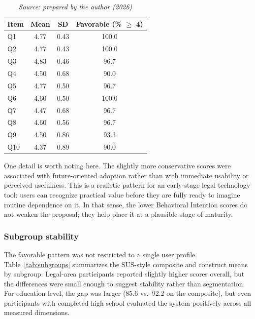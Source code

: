 \documentclass[english]{UNISINOSartigo} %
\newcommand{\floatsource}[1]{\caption*{\footnotesize\textit{Source: #1}}}
\newcommand{\tablesource}[1]{\floatsource{#1}}
\begin{document}
\begin{table}[H]\centering
\caption{Item-level scores after reverse coding of negative items.}
\label{tab:item-results}
\footnotesize
\setlength{\tabcolsep}{4pt}
\begin{tabular}{@{}lccc@{}}
\toprule
\textbf{Item} & \textbf{Mean} & \textbf{SD} & \textbf{Favorable (\% $\geq$ 4)} \\
\midrule
Q1 & 4.77 & 0.43 & 100.0 \\
Q2 & 4.77 & 0.43 & 100.0 \\
Q3 & 4.83 & 0.46 & 96.7 \\
Q4 & 4.50 & 0.68 & 90.0 \\
Q5 & 4.77 & 0.50 & 96.7 \\
Q6 & 4.60 & 0.50 & 100.0 \\
Q7 & 4.47 & 0.68 & 96.7 \\
Q8 & 4.60 & 0.56 & 96.7 \\
Q9 & 4.50 & 0.86 & 93.3 \\
Q10 & 4.37 & 0.89 & 90.0 \\
\bottomrule
\end{tabular}
\tablesource{prepared by the author (2026)}
\end{table}

One detail is worth noting here. The slightly more conservative scores were associated with future-oriented adoption rather than with immediate usability or perceived usefulness. This is a realistic pattern for an early-stage legal technology tool: users can recognize practical value before they are fully ready to imagine routine dependence on it. In that sense, the lower Behavioral Intention scores do not weaken the proposal; they help place it at a plausible stage of maturity.

\subsubsection{Subgroup stability}

The favorable pattern was not restricted to a single user profile. Table~\ref{tab:subgroups} summarizes the SUS-style composite and construct means by subgroup. Legal-area participants reported slightly higher scores overall, but the differences were small enough to suggest stability rather than segmentation. For education level, the gap was larger (85.6 vs.\ 92.2 on the composite), but even participants with completed high school evaluated the system positively across all measured dimensions.
\end{document}
